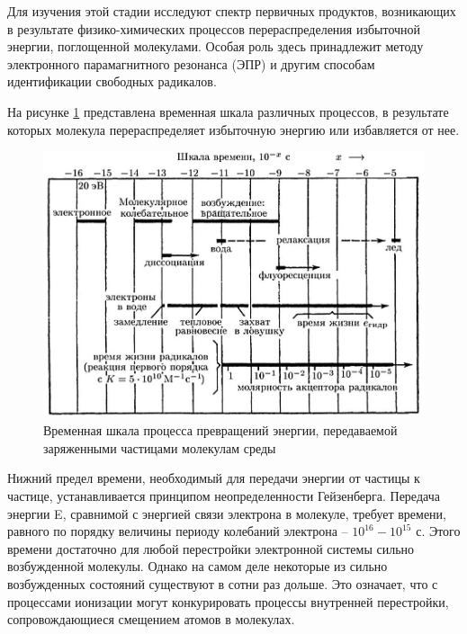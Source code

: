 \documentclass[a4paper, 14pt]{article}
\begin{document}
Для изучения этой стадии исследуют спектр первичных продуктов, возникающих в результате физико-химических процессов перераспределения избыточной энергии, поглощенной молекулами. Особая роль здесь принадлежит методу электронного парамагнитного резонанса (ЭПР) и другим способам идентификации свободных радикалов.

На рисунке \ref{timeScale} представлена временная шкала различных процессов, в результате
которых молекула перераспределяет избыточную энергию или избавляется от нее.
\begin{figure}[htbp]
    \centering
    \includegraphics[width=\textwidth]{timeScale.jpg}
    \caption{Временная шкала процесса превращений энергии, передаваемой заряженными частицами молекулам среды}
    \label{timeScale}
\end{figure}
Нижний предел времени, необходимый для передачи энергии от частицы к
частице, устанавливается принципом неопределенности Гейзенберга. Передача
энергии E, сравнимой с энергией связи электрона в молекуле, требует времени,
равного по порядку величины периоду колебаний электрона – $10^{16}-10^{15}$ с. Этого
времени достаточно для любой перестройки электронной системы сильно
возбужденной молекулы. Однако на самом деле некоторые из сильно возбужденных
состояний существуют в сотни раз дольше. Это означает, что с процессами ионизации могут конкурировать процессы внутренней перестройки, сопровождающиеся
смещением атомов в молекулах.
\end{document}
